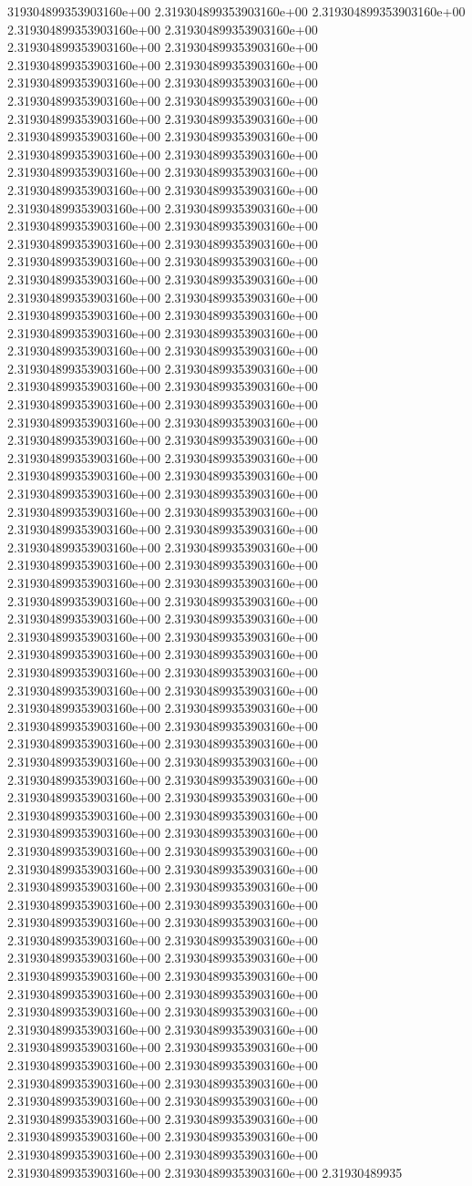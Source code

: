 319304899353903160e+00	2.319304899353903160e+00	2.319304899353903160e+00	2.319304899353903160e+00	2.319304899353903160e+00	2.319304899353903160e+00	2.319304899353903160e+00	2.319304899353903160e+00	2.319304899353903160e+00	2.319304899353903160e+00	2.319304899353903160e+00	2.319304899353903160e+00	2.319304899353903160e+00	2.319304899353903160e+00	2.319304899353903160e+00	2.319304899353903160e+00	2.319304899353903160e+00	2.319304899353903160e+00	2.319304899353903160e+00	2.319304899353903160e+00	2.319304899353903160e+00	2.319304899353903160e+00	2.319304899353903160e+00	2.319304899353903160e+00	2.319304899353903160e+00	2.319304899353903160e+00	2.319304899353903160e+00	2.319304899353903160e+00	2.319304899353903160e+00	2.319304899353903160e+00	2.319304899353903160e+00	2.319304899353903160e+00	2.319304899353903160e+00	2.319304899353903160e+00	2.319304899353903160e+00	2.319304899353903160e+00	2.319304899353903160e+00	2.319304899353903160e+00	2.319304899353903160e+00	2.319304899353903160e+00	2.319304899353903160e+00	2.319304899353903160e+00	2.319304899353903160e+00	2.319304899353903160e+00	2.319304899353903160e+00	2.319304899353903160e+00	2.319304899353903160e+00	2.319304899353903160e+00	2.319304899353903160e+00	2.319304899353903160e+00	2.319304899353903160e+00	2.319304899353903160e+00	2.319304899353903160e+00	2.319304899353903160e+00	2.319304899353903160e+00	2.319304899353903160e+00	2.319304899353903160e+00	2.319304899353903160e+00	2.319304899353903160e+00	2.319304899353903160e+00	2.319304899353903160e+00	2.319304899353903160e+00	2.319304899353903160e+00	2.319304899353903160e+00	2.319304899353903160e+00	2.319304899353903160e+00	2.319304899353903160e+00	2.319304899353903160e+00	2.319304899353903160e+00	2.319304899353903160e+00	2.319304899353903160e+00	2.319304899353903160e+00	2.319304899353903160e+00	2.319304899353903160e+00	2.319304899353903160e+00	2.319304899353903160e+00	2.319304899353903160e+00	2.319304899353903160e+00	2.319304899353903160e+00	2.319304899353903160e+00	2.319304899353903160e+00	2.319304899353903160e+00	2.319304899353903160e+00	2.319304899353903160e+00	2.319304899353903160e+00	2.319304899353903160e+00	2.319304899353903160e+00	2.319304899353903160e+00	2.319304899353903160e+00	2.319304899353903160e+00	2.319304899353903160e+00	2.319304899353903160e+00	2.319304899353903160e+00	2.319304899353903160e+00	2.319304899353903160e+00	2.319304899353903160e+00	2.319304899353903160e+00	2.319304899353903160e+00	2.319304899353903160e+00	2.319304899353903160e+00	2.319304899353903160e+00	2.319304899353903160e+00	2.319304899353903160e+00	2.319304899353903160e+00	2.319304899353903160e+00	2.319304899353903160e+00	2.319304899353903160e+00	2.319304899353903160e+00	2.319304899353903160e+00	2.319304899353903160e+00	2.319304899353903160e+00	2.319304899353903160e+00	2.319304899353903160e+00	2.319304899353903160e+00	2.319304899353903160e+00	2.319304899353903160e+00	2.319304899353903160e+00	2.319304899353903160e+00	2.319304899353903160e+00	2.319304899353903160e+00	2.319304899353903160e+00	2.319304899353903160e+00	2.319304899353903160e+00	2.319304899353903160e+00	2.319304899353903160e+00	2.319304899353903160e+00	2.319304899353903160e+00	2.319304899353903160e+00	2.319304899353903160e+00	2.319304899353903160e+00	2.319304899353903160e+00	2.319304899353903160e+00	2.319304899353903160e+00	2.31930489935